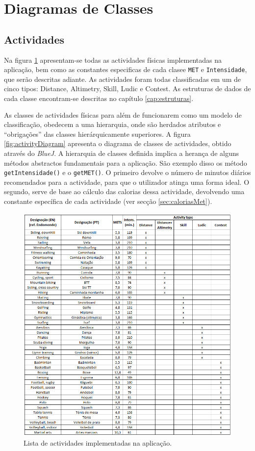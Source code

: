 \documentclass[a4paper,10pt]{report}
\begin{document}
\section{Diagramas de Classes}
\label{sec:classes}
\subsection{Actividades}
\label{subsec:actividadesDiagrama}
Na figura \ref{fig:activityTable} apresentam-se todas as actividades físicas implementadas na aplicação, 
bem como as constantes especificas de cada clasee \verb!MET! e \verb!Intensidade!, que serão descritas adiante.
As actividades foram todas classificadas em um de cinco tipos: Distance, Altimetry, Skill, Ludic e Contest.
As estruturas de dados de cada classe encontram-se descritas no capítulo \ref{cap:estruturas}.

As classes de actividades físicas para além de funcionarem como um modelo de classificação, 
obedecem a uma hierarquia, onde são herdados atributos e ``obrigações'' das classes hierárquicamente superiores.
A figura \ref{fig:activityDiagram} apresenta o diagrama de classes de actividades, obtido através do \emph{BlueJ}.
A hierarquia de classes definida implica a herança de alguns métodos abstractos fundamentais para a aplicação.
São exemplo disso os método \verb!getIntensidade()! e o \verb!getMET()!.
O primeiro devolve o número de minutos diários recomendados para a actividade, para que o utilizador atinga uma forma ideal. 
O segundo, serve de base ao cálculo das calorias dessa actividade, devolvendo uma constante específica de cada actividade (ver secção \ref{sec:caloriasMet}).

\begin{figure}
\centering
\includegraphics[width=\textwidth]{activitiesTable.png}
\caption{Lista de actividades implementadas na aplicação.}
\label{fig:activityTable}
\end{figure}
\end{document}
